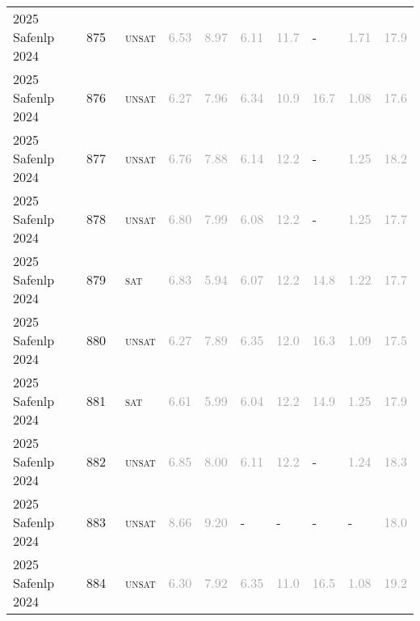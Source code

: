 \begin{center}
{\begin{longtable}{@{}llllllllll@{}}
2025 Safenlp 2024 & 875 & ~\textsc{unsat} & \textcolor{darkgray}{6.53} & \textcolor{darkgray}{8.97} & \textcolor{darkgray}{6.11} & \textcolor{darkgray}{11.7} & - & \textcolor{darkgray}{1.71} & \textcolor{darkgray}{17.9} \\
2025 Safenlp 2024 & 876 & ~\textsc{unsat} & \textcolor{darkgray}{6.27} & \textcolor{darkgray}{7.96} & \textcolor{darkgray}{6.34} & \textcolor{darkgray}{10.9} & \textcolor{darkgray}{16.7} & \textcolor{darkgray}{1.08} & \textcolor{darkgray}{17.6} \\
2025 Safenlp 2024 & 877 & ~\textsc{unsat} & \textcolor{darkgray}{6.76} & \textcolor{darkgray}{7.88} & \textcolor{darkgray}{6.14} & \textcolor{darkgray}{12.2} & - & \textcolor{darkgray}{1.25} & \textcolor{darkgray}{18.2} \\
2025 Safenlp 2024 & 878 & ~\textsc{unsat} & \textcolor{darkgray}{6.80} & \textcolor{darkgray}{7.99} & \textcolor{darkgray}{6.08} & \textcolor{darkgray}{12.2} & - & \textcolor{darkgray}{1.25} & \textcolor{darkgray}{17.7} \\
2025 Safenlp 2024 & 879 & ~\textsc{sat} & \textcolor{darkgray}{6.83} & \textcolor{darkgray}{5.94} & \textcolor{darkgray}{6.07} & \textcolor{darkgray}{12.2} & \textcolor{darkgray}{14.8} & \textcolor{darkgray}{1.22} & \textcolor{darkgray}{17.7} \\
2025 Safenlp 2024 & 880 & ~\textsc{unsat} & \textcolor{darkgray}{6.27} & \textcolor{darkgray}{7.89} & \textcolor{darkgray}{6.35} & \textcolor{darkgray}{12.0} & \textcolor{darkgray}{16.3} & \textcolor{darkgray}{1.09} & \textcolor{darkgray}{17.5} \\
2025 Safenlp 2024 & 881 & ~\textsc{sat} & \textcolor{darkgray}{6.61} & \textcolor{darkgray}{5.99} & \textcolor{darkgray}{6.04} & \textcolor{darkgray}{12.2} & \textcolor{darkgray}{14.9} & \textcolor{darkgray}{1.25} & \textcolor{darkgray}{17.9} \\
2025 Safenlp 2024 & 882 & ~\textsc{unsat} & \textcolor{darkgray}{6.85} & \textcolor{darkgray}{8.00} & \textcolor{darkgray}{6.11} & \textcolor{darkgray}{12.2} & - & \textcolor{darkgray}{1.24} & \textcolor{darkgray}{18.3} \\
2025 Safenlp 2024 & 883 & ~\textsc{unsat} & \textcolor{darkgray}{8.66} & \textcolor{darkgray}{9.20} & - & - & - & - & \textcolor{darkgray}{18.0} \\
2025 Safenlp 2024 & 884 & ~\textsc{unsat} & \textcolor{darkgray}{6.30} & \textcolor{darkgray}{7.92} & \textcolor{darkgray}{6.35} & \textcolor{darkgray}{11.0} & \textcolor{darkgray}{16.5} & \textcolor{darkgray}{1.08} & \textcolor{darkgray}{19.2} \\

\end{longtable}}
\end{center}
